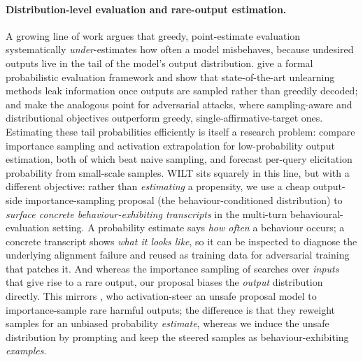 \paragraph{Distribution-level evaluation and rare-output estimation.}
A growing line of work argues that greedy, point-estimate evaluation systematically \emph{under}-estimates how often a model misbehaves, because undesired outputs live in the tail of the model's output distribution.
\citet{scholten2024probabilistic} give a formal probabilistic evaluation framework and show that state-of-the-art unlearning methods leak information once outputs are sampled rather than greedily decoded; \citet{beyer2026sampling} and \citet{geisler2025reinforce} make the analogous point for adversarial attacks, where sampling-aware and distributional objectives outperform greedy, single-affirmative-target ones.
Estimating these tail probabilities efficiently is itself a research problem: \citet{wu2024rare} compare importance sampling and activation extrapolation for low-probability output estimation, both of which beat naive sampling, and \citet{jones2025forecasting} forecast per-query elicitation probability from small-scale samples.
WILT sits squarely in this line, but with a different objective: rather than \emph{estimating} a propensity, we use a cheap output-side importance-sampling proposal (the behaviour-conditioned distribution) to \emph{surface concrete behaviour-exhibiting transcripts} in the multi-turn behavioural-evaluation setting.
A probability estimate says \emph{how often} a behaviour occurs; a concrete transcript shows \emph{what it looks like}, so it can be inspected to diagnose the underlying alignment failure and reused as training data for adversarial training that patches it.
And whereas the importance sampling of \citet{wu2024rare} searches over \emph{inputs} that give rise to a rare output, our proposal biases the \emph{output} distribution directly.
This mirrors \citet{angell2026tail}, who activation-steer an unsafe proposal model to importance-sample rare harmful outputs; the difference is that they reweight samples for an unbiased probability \emph{estimate}, whereas we induce the unsafe distribution by prompting and keep the steered samples as behaviour-exhibiting \emph{examples}.



